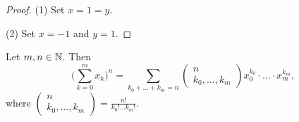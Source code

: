 \begin{proof}
(1) Set $x = 1 = y$.

(2) Set $x = -1$ and $y = 1$.
\end{proof}
\begin{corollary} \label{multinomialIdentity}
Let $m,n\in \mathbb{N}$. Then
\[ \Big(\sum_{k=0}^m x_k\Big)^n = \sum_{k_0+\ldots + k_m = n}\begin{pmatrix}
n \\ k_0, \ldots, k_m
\end{pmatrix}x_0^{k_0}\cdot\ldots\cdot x_m^{k_m}, \]
where $\begin{pmatrix}
n \\ k_0, \ldots, k_m
\end{pmatrix} = \frac{n!}{k_0!\ldots k_m!}$.
\end{corollary}

